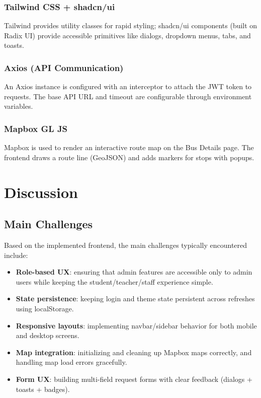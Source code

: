 \documentclass[12pt,a4paper]{report}
\begin{document}
\subsection{Tailwind CSS + shadcn/ui}
Tailwind provides utility classes for rapid styling; shadcn/ui components (built on Radix UI) provide accessible primitives like dialogs, dropdown menus, tabs, and toasts.

\subsection{Axios (API Communication)}
An Axios instance is configured with an interceptor to attach the JWT token to requests. The base API URL and timeout are configurable through environment variables.

\subsection{Mapbox GL JS}
Mapbox is used to render an interactive route map on the Bus Details page. The frontend draws a route line (GeoJSON) and adds markers for stops with popups.

\chapter{Discussion}

\section{Main Challenges}
Based on the implemented frontend, the main challenges typically encountered include:
\begin{itemize}[leftmargin=1.2cm]
  \item \textbf{Role-based UX}: ensuring that admin features are accessible only to admin users while keeping the student/teacher/staff experience simple.
  \item \textbf{State persistence}: keeping login and theme state persistent across refreshes using localStorage.
  \item \textbf{Responsive layouts}: implementing navbar/sidebar behavior for both mobile and desktop screens.
  \item \textbf{Map integration}: initializing and cleaning up Mapbox maps correctly, and handling map load errors gracefully.
  \item \textbf{Form UX}: building multi-field request forms with clear feedback (dialogs + toasts + badges).
\end{itemize}
\end{document}
